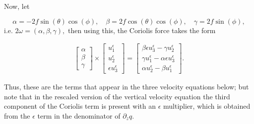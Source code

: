 \documentclass[11pt, a4paper]{article}
\begin{document}
Now, let

$$\alpha = -2 f \sin(\theta)\cos(\phi), \quad \beta = 2 f \cos(\theta) \cos(\phi), \quad \gamma = 2 f \sin(\phi),$$
%
i.e. $2 \omega = (\alpha, \beta, \gamma),$ then using this, the Coriolis force takes the form

\begin{gather}
\begin{bmatrix} \alpha \\ \beta \\ \gamma \end{bmatrix}
\times
\begin{bmatrix} u_1^\epsilon \\ u_2^\epsilon \\ \epsilon u_3^\epsilon \end{bmatrix}
=
\begin{bmatrix} \beta \epsilon u_3^\epsilon - \gamma u_2^\epsilon \\ \gamma u_1^\epsilon - \alpha \epsilon u_3^\epsilon \\ \alpha u_2^\epsilon - \beta u_1^\epsilon \end{bmatrix}.
\end{gather}

Thus, these are the terms that appear in the three velocity equations below; but note that in the rescaled version of the vertical velocity equation the third component of the Coriolis term is present with an $\epsilon$ multiplier, which is obtained from the $\epsilon$ term in the denominator of $\partial_z q.$
\end{document}
